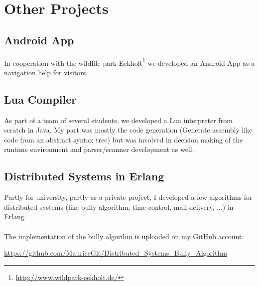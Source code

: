 \documentclass[a4paper, 12pt]{article}
\begin{document}
\section{Other Projects}

\subsection{Android App}

In cooperation with the wildlife park Eekholt\footnote{\url{http://www.wildpark-eekholt.de/}} we developed an Android 
App as a navigation help for visitors. 

\subsection{Lua Compiler}

As part of a team of several students, we developed a Lua interpreter from scratch in Java. My part was mostly the 
code generation (Generate assembly like code from an abstract syntax tree) but was involved in decision making
of the runtime environment and parser/scanner development as well. 

\subsection{Distributed Systems in Erlang}
 
Partly for university, partly as a private project, I developed a few algorithms for distributed systems (like 
bully algorithm, time control, mail delivery, ...) in Erlang.
\\
\\
The implementation of the bully algorihm is uploaded on my GitHub account:
\begin{center}
	\url{https://github.com/MauriceGit/Distributed_Systems_Bully_Algorithm}
\end{center}

 
\end{document}
